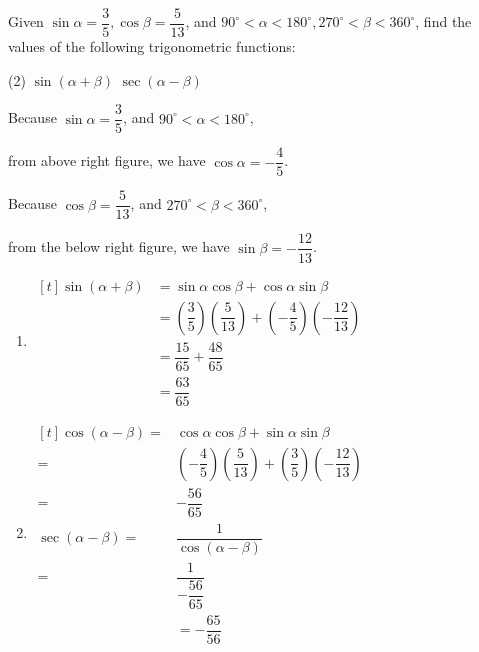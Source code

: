 \documentclass{report}
\begin{document}
\begin{question}
	Given $\sin \alpha=\dfrac{3}{5}, \cos \beta=\dfrac{5}{13}$, and $90^{\circ}<\alpha<180^{\circ}, 270^{\circ}<\beta<360^{\circ}$, find the values of the following trigonometric functions:
	\begin{tasks}[label=(\alph*)](2)
		\task $\sin (\alpha+\beta)$
		\task $\sec (\alpha-\beta)$
	\end{tasks}
	
	\sol{}
	\vspace{-1em}
	\begin{multicols}{2}
		\noindent Because $\sin \alpha=\dfrac{3}{5}$, and $90^{\circ}<\alpha<180^{\circ}$, 
		
		\vspace{-1em}
		\noindent from above right figure, we have $\cos \alpha=-\dfrac{4}{5}$. 
		
		\vspace{-1em}
		\noindent Because $\cos \beta=\dfrac{5}{13}$, and $270^{\circ}<\beta<360^{\circ}$, 
		
		\vspace{-1em}
		\noindent from the below right figure, we have $\sin \beta=-\dfrac{12}{13}$.
		
		\begin{enumerate}[label=(\alph*), leftmargin=*, labelsep=1.5em]
			\item $\begin{aligned}[t] \sin (\alpha+\beta) & =\sin \alpha \cos \beta+\cos \alpha \sin \beta \\ & =\left(\dfrac{3}{5}\right)\left(\dfrac{5}{13}\right)+\left(-\dfrac{4}{5}\right)\left(-\dfrac{12}{13}\right) \\ & =\dfrac{15}{65}+\dfrac{48}{65} \\ & =\dfrac{63}{65}\end{aligned}$
			\item $\begin{aligned}[t] \cos (\alpha-\beta)= & \cos \alpha \cos \beta+\sin \alpha \sin \beta \\ = & \left(-\dfrac{4}{5}\right)\left(\dfrac{5}{13}\right)+\left(\dfrac{3}{5}\right)\left(-\dfrac{12}{13}\right) \\ = & -\dfrac{56}{65} \\ \sec (\alpha-\beta)= & \dfrac{1}{\cos (\alpha-\beta)} \\ = & \dfrac{1}{-\dfrac{56}{65}} \\ & = -\dfrac{65}{56}\end{aligned}$
		\end{enumerate}
		

\end{multicols}
\end{question}
\end{document}

